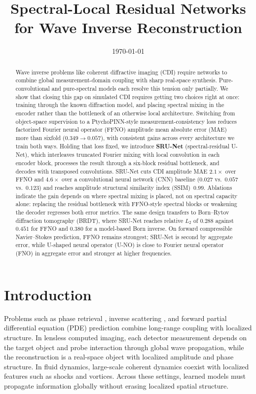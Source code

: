 \documentclass[11pt]{article}
\title{Spectral-Local Residual Networks for Wave Inverse Reconstruction}
\author{}
\date{\today}
\begin{document}
\maketitle


\begin{abstract}
Wave inverse problems like coherent diffractive imaging (CDI) require networks to combine global
measurement-domain coupling with sharp real-space synthesis. Pure-convolutional
and pure-spectral models each resolve this tension only partially. We show that closing this gap on simulated
CDI requires getting two choices right at once: training through the known diffraction model, and
placing spectral mixing in the encoder rather than the bottleneck of an otherwise local
architecture. Switching from object-space supervision to a PtychoPINN-style measurement-consistency
loss reduces factorized Fourier neural operator (FFNO) amplitude mean absolute error (MAE)
more than sixfold ($0.349 \to 0.057$), with consistent gains
across every architecture we train both ways. Holding that loss fixed, we introduce \textbf{SRU-Net}
(spectral-residual U-Net),
which interleaves truncated Fourier mixing with local convolution in each encoder block, processes
the result through a six-block residual bottleneck, and decodes with transposed convolutions.
SRU-Net cuts CDI amplitude MAE $2.1\times$ over FFNO and $4.6\times$ over a
convolutional neural network (CNN) baseline
($0.027$ vs.\ $0.057$ vs.\ $0.123$) and reaches amplitude structural similarity
index (SSIM)~$0.99$. Ablations indicate the gain
depends on where spectral mixing is placed, not on spectral capacity alone: replacing the residual
bottleneck with FFNO-style spectral blocks or weakening the decoder regresses both error metrics.
The same design transfers to Born--Rytov diffraction tomography (BRDT), where SRU-Net reaches relative
$L_2$ of $0.288$ against $0.451$ for FFNO and $0.380$ for a model-based Born inverse. On forward
compressible Navier--Stokes prediction, FFNO remains strongest; SRU-Net is
second by aggregate error, while U-shaped neural operator (U-NO) is close to
Fourier neural operator (FNO) in aggregate error and
stronger at higher frequencies.
\end{abstract}

\section{Introduction}

Problems such as phase retrieval \cite{fienup}, inverse scattering
\cite{devaney}, and forward partial differential equation (PDE) prediction
combine long-range coupling with localized structure. In lensless computed
imaging, each detector measurement depends on the target object and probe
interaction through global wave propagation, while the reconstruction is a
real-space object with localized amplitude and phase structure. In fluid
dynamics, large-scale coherent dynamics coexist with localized features such as
shocks and vortices. Across these settings, learned models must propagate
information globally without erasing localized spatial structure.
\end{document}
